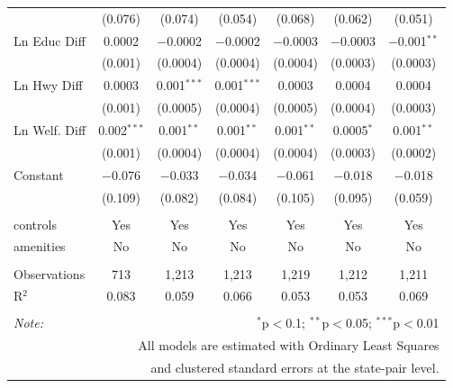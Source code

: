 \begin{table}[!htbp]
\begin{tabular}{@{\extracolsep{5pt}}lcccccc}
  & (0.076) & (0.074) & (0.054) & (0.068) & (0.062) & (0.051) \\ 
  Ln Educ Diff & 0.0002 & $-$0.0002 & $-$0.0002 & $-$0.0003 & $-$0.0003 & $-$0.001$^{**}$ \\ 
  & (0.001) & (0.0004) & (0.0004) & (0.0004) & (0.0003) & (0.0003) \\ 
  Ln Hwy Diff & 0.0003 & 0.001$^{***}$ & 0.001$^{***}$ & 0.0003 & 0.0004 & 0.0004 \\ 
  & (0.001) & (0.0005) & (0.0004) & (0.0005) & (0.0004) & (0.0003) \\ 
  Ln Welf. Diff & 0.002$^{***}$ & 0.001$^{**}$ & 0.001$^{**}$ & 0.001$^{**}$ & 0.0005$^{*}$ & 0.001$^{**}$ \\ 
  & (0.001) & (0.0004) & (0.0004) & (0.0004) & (0.0003) & (0.0002) \\ 
  Constant & $-$0.076 & $-$0.033 & $-$0.034 & $-$0.061 & $-$0.018 & $-$0.018 \\ 
  & (0.109) & (0.082) & (0.084) & (0.105) & (0.095) & (0.059) \\ 
 \hline \\[-1.8ex] 
controls & Yes & Yes & Yes & Yes & Yes & Yes \\ 
amenities & No & No & No & No & No & No \\ 
\hline \\[-1.8ex] 
Observations & 713 & 1,213 & 1,213 & 1,219 & 1,212 & 1,211 \\ 
R$^{2}$ & 0.083 & 0.059 & 0.066 & 0.053 & 0.053 & 0.069 \\ 
\hline 
\hline \\[-1.8ex] 
\textit{Note:}  & \multicolumn{6}{r}{$^{*}$p$<$0.1; $^{**}$p$<$0.05; $^{***}$p$<$0.01} \\ 
 & \multicolumn{6}{r}{All models are estimated with Ordinary Least Squares} \\ 
 & \multicolumn{6}{r}{and clustered standard errors at the state-pair level.} \\ 
\end{tabular} 
\end{table} 
